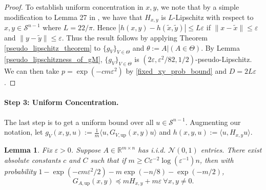 \documentclass[11pt]{article}
\newcommand{\R}{\mathbb{R}}
\newcommand{\N}{\mathcal{N}}
\newcommand{\Scal}{\mathcal{S}}
\renewcommand{\epsilon}{\varepsilon}
\newtheorem{lemma}{Lemma}
\begin{document}
\begin{proof}
To establish uniform concentration in $x,y$, we note that by a simple modification to Lemma 27 in \cite{HLV18}, we have that $H_{x,y}$ is $L$-Lipschitz with respect to $x,y \in \Scal^{n-1}$ where $L = 22/\pi$. Hence $|h(x,y) - h(\tilde{x},\tilde{y})|\leqslant L\epsilon$ if $\|x-\tilde{x}\| \leqslant \epsilon$ and $\|y-\tilde{y}\|\leqslant \epsilon$.  Thus the result follows by applying Theorem \ref{pseudo_lipschitz_theorem} to $\{g_V\}_{V \in \Theta}$ and $\theta := A|(A \in \Theta)$. By Lemma \ref{pseudo_lipschitzness_of_gM}, $\{g_V\}_{V \in \Theta}$ is $(2\epsilon,\epsilon^2/82,1/2)$-pseudo-Lipschitz. We can then take $p = \exp(-cm\epsilon^2)$ by \eqref{fixed_xy_prob_bound} and $D = 2L\epsilon$. \end{proof}

\paragraph{\textbf{Step 3: Uniform Concentration.}} The last step is to get a uniform bound over all $u \in \Scal^{n-1}$. Augmenting our notation, let $g_V(x,y,u) := \frac{1}{m}\langle u,G_{V,\text{up}}(x,y)u\rangle$ and $h(x,y,u) := \langle u, H_{x,y}u\rangle.$
\begin{lemma} \label{Daskalaskis_ext_upper_bound}
Fix $\epsilon > 0$. Suppose $A \in \R^{m \times n}$ has i.i.d. $\N(0,1)$ entries. There exist absolute constants $c$ and $C$ such that if $m \geqslant C\epsilon^{-2}\log(\epsilon^{-1})n$, then with probability $1 - \exp(-cm\epsilon^2/2) - m\exp(-n/8) - \exp(-m/2)$, $$G_{A,\text{up}}(x,y) \preceq mH_{x,y} + m\epsilon\ \forall x,y\neq0.$$
\end{lemma}
\end{document}
